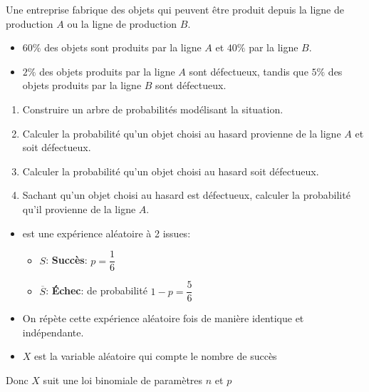 \begin{exercice_cours}[Probabilités]{}

Une entreprise fabrique des objets qui peuvent être produit depuis la ligne de production $A$ ou la ligne de production $B$.

\begin{itemize}
	\item $60\%$ des objets sont produits par la ligne $A$ et $40\%$ par la ligne $B$.
	\item $2\%$ des objets produits par la ligne $A$ sont défectueux, tandis que $5\%$ des objets produits par la ligne $B$ sont défectueux.
\end{itemize}

\begin{enumerate}
		\item Construire un arbre de probabilités modélisant la situation.
		\item Calculer la probabilité qu'un objet choisi au hasard provienne de la ligne $A$ et soit défectueux.
		\item Calculer la probabilité qu'un objet choisi au hasard soit défectueux.
		\item Sachant qu'un objet choisi au hasard est défectueux, calculer la probabilité qu'il provienne de la ligne $A$.
\end{enumerate}

\end{exercice_cours}

\begin{easybox}{}
\begin{itemize}
	\item {} est une expérience aléatoire à 2 issues:
	\begin{itemize}
		\item $S$: \textbf{Succès}:  $p=\dfrac{1}{6}$
		\item $\overline{S}$: \textbf{Échec}:  de probabilité $1-p=\dfrac{5}{6}$
	\end{itemize}
	\item On répète cette expérience aléatoire  fois de manière identique et indépendante.
	\item $X$ est la variable aléatoire qui compte le nombre de succès
\end{itemize}

Donc $X$ suit une loi binomiale de paramètres $n$ et $p$
\end{easybox}

